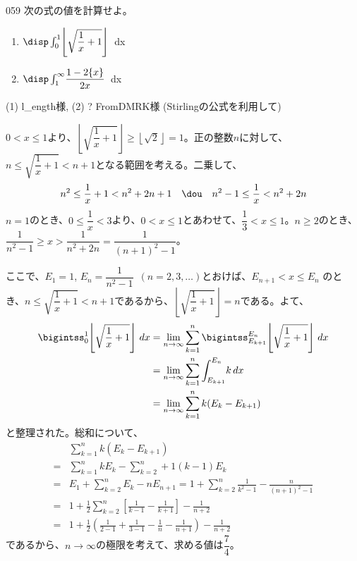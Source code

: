 \begin{prob}{059}{}{}
 次の式の値を計算せよ。
 \begin{enumerate}
  \item $\disp \int_0^1\! \left\lfloor \sqrt{\dfrac{1}{x}+1} \right\rfloor$ \,dx
  \item $\disp \int_1^\infty\! \dfrac{1-2\{x\}}{2x}$ \,dx
 \end{enumerate}
 (1)  l\_ength様, (2) \hosi ? FromDMRK様 (Stirlingの公式を利用して)
\end{prob}
$0<x\le 1$より、$\left\lfloor \sqrt{\dfrac{1}{x}+1} \right\rfloor \ge \left\lfloor\sqrt{2}\right\rfloor=1$。正の整数$n$に対して、$n\le \sqrt{\dfrac{1}{x}+1}<n+1$となる範囲を考える。二乗して、
\[ n^2\le \frac{1}{x}+1 < n^2+2n+1 \quad\dou\quad n^2-1\le \frac{1}{x}<n^2+2n \]
$n=1$のとき、$0\le \dfrac{1}{x}<3$より、$0<x\le 1$とあわせて、$\dfrac{1}{3}<x\le 1$。$n\ge 2$のとき、$\dfrac{1}{n^2-1}\ge x>\dfrac{1}{n^2+2n}=\dfrac{1}{(n+1)^2-1}$。

ここで、$E_1=1$, $E_n=\dfrac{1}{n^2-1}$~$(n=2, 3, \dots)$とおけば、$E_{n+1}<x\le E_n$ のとき、$n\le \sqrt{\dfrac{1}{x}+1}<n+1$であるから、$\left\lfloor\sqrt{\dfrac{1}{x}+1}\right\rfloor=n$である。よて、
\begin{align*}
 \bigintss_0^1\! \left\lfloor\sqrt{\frac{1}{x}+1}\right\rfloor \,dx &=\lim_{n\to\infty}\sum_{k=1}^n\bigintss_{E_{k+1}}^{E_n}\!\left\lfloor\sqrt{\frac{1}{x}+1}\right\rfloor \,dx \\
 &= \lim_{n\to\infty}\sum_{k=1}^n\int_{E_{k+1}}^{E_n}\!k\,dx \\
 &=\lim_{n\to\infty}\sum_{k=1}^n k(E_k-E_{k+1})
\end{align*}
と整理された。総和について、
\begin{align*}
 &\sum_{k=1}^nk(E_k-E_{k+1}) \\
 =& \sum_{k=1}^nkE_k - \sum_{k=2}^n+1(k-1)E_k \\
 =& E_1 + \sum_{k=2}^nE_k -nE_{n+1} = 1+\sum_{k=2}^n\frac{1}{k^2-1}-\frac{n}{(n+1)^2-1} \\
 =& 1+\frac{1}{2}\sum_{k=2}^n\left[\frac{1}{k-1}-\frac{1}{k+1}\right] - \frac{1}{n+2} \\
 =& 1+\frac{1}{2}\left(\frac{1}{2-1}+\frac{1}{3-1}-\frac{1}{n}-\frac{1}{n+1}\right) -\frac{1}{n+2}
\end{align*}
であるから、$n\to\infty$の極限を考えて、求める値は$\dfrac{7}{4}$。

